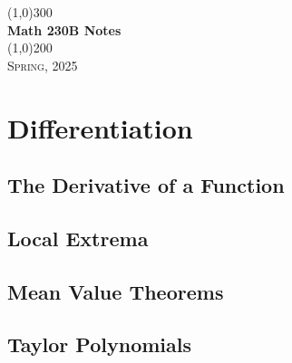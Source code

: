 \documentclass[a4paper, openany]{book}
\begin{document}
\begin{titlepage}
    \begin{center}
        \line(1,0){300} \\
        [0.25in]
        \huge{\bfseries Math 230B Notes} \\
        [2mm]
        \line(1,0){200} \\
        [1.5cm]
        \textsc{\LARGE Spring, 2025}
    \end{center}
\end{titlepage}

\tableofcontents
\setcounter{section}{0}

\chapter{Differentiation}

\section{The Derivative of a Function}

\newpage

\section{Local Extrema}

\newpage

\section{Mean Value Theorems}

\newpage

\section{Taylor Polynomials}

\newpage
\end{document}
